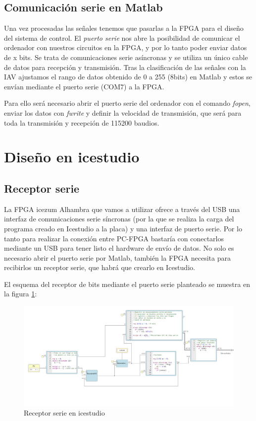 \subsection{Comunicación serie en Matlab}

Una vez procesadas las señales tenemos que pasarlas a la FPGA para el diseño del sistema de control. El \textit{puerto serie} nos abre la posibilidad de comunicar el ordenador con nuestros circuitos en la FPGA, y por lo tanto poder enviar datos de x bits. Se trata de comunicaciones serie asíncronas y se utiliza un único cable de datos para recepción y transmisión. Tras la clasificación de las señales con la IAV ajustamos el rango de datos obtenido de 0 a 255  (8bits) en Matlab y estos se envían mediante el puerto serie (COM7) a la FPGA.\newline

Para ello será necesario abrir el puerto serie del ordenador con el comando \textit{fopen}, enviar los datos con \textit{fwrite} y definir la velocidad de transmisión, que será para toda la transmisión y recepción de 115200 baudios.

\section{Diseño en icestudio}

\subsection{Receptor serie}\label{sec:rserie}

La FPGA icezum Alhambra que vamos a utilizar ofrece a través del USB una interfaz de comunicaciones serie síncronas (por la que se realiza la carga del programa creado en Icestudio a la placa) y una interfaz de puerto serie. Por lo tanto para realizar la conexión entre PC-FPGA bastaría con conectarlos mediante un USB para tener listo el hardware de envío de datos. No solo es necesario abrir el puerto serie por Matlab, también la FPGA necesita para recibirlos un receptor serie, que habrá que crearlo en Icestudio.\newline

El esquema del receptor de bits mediante el puerto serie planteado se muestra en la figura \ref{fig:receptorserie}:

\begin{figure}[H]
	\center
	\includegraphics[scale=0.5]{imagenes/Disenodelsistema/receptorserie.png}
	\caption{Receptor serie en icestudio}
	\label{fig:receptorserie}
\end{figure}

